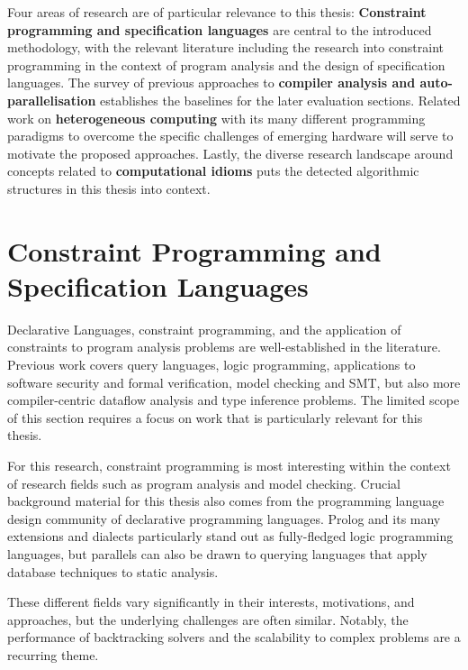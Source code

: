 
    Four areas of research are of particular relevance to this thesis:
    {\bf Constraint programming and specification languages} are central to the
    introduced methodology, with the relevant literature including the research
    into constraint programming in the context of program analysis and
    the design of specification languages.
    The survey of previous approaches to
    {\bf compiler analysis and auto-parallelisation}
    establishes the baselines for the later evaluation sections.
    Related work on {\bf heterogeneous computing} with its many different
    programming paradigms to overcome the specific challenges of emerging
    hardware will serve to motivate the proposed approaches.
    Lastly, the diverse research landscape around concepts related to
    {\bf computational idioms} puts the detected algorithmic structures in this
    thesis into context.

\section{Constraint Programming and Specification Languages}

    Declarative Languages, constraint programming, and the application of
    constraints to program analysis problems are well-established in the
    literature.
    Previous work covers query languages, logic programming, applications to
    software security and formal verification, model checking and SMT,
    but also more compiler-centric dataflow analysis and type inference
    problems.
    The limited scope of this section requires a focus on work that is
    particularly relevant for this thesis.

    For this research, constraint programming is most interesting within the
    context of research fields such as program analysis and model checking.
    Crucial background material for this thesis also comes from
    the programming language design community of declarative programming
    languages.
    Prolog and its many extensions and dialects particularly stand out as
    fully-fledged logic programming languages, but parallels can also be drawn
    to querying languages that apply database techniques to static analysis.

    These different fields vary significantly in their interests, motivations,
    and approaches, but the underlying challenges are often similar.
    Notably, the performance of backtracking solvers and the scalability to
    complex problems are a recurring theme.

